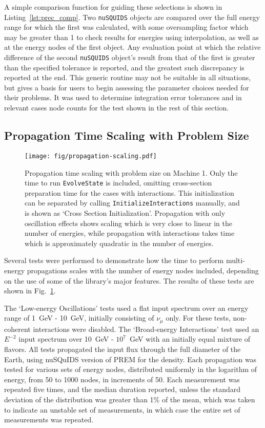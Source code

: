 \documentclass[3p,12pt]{elsarticle}
\newcommand{\ttf}{\ttfamily}
\begin{document}
A simple comparison function for guiding these selections is shown in Listing~\ref{lst:prec_comp}. 
Two \lstinline{nuSQUIDS} objects are compared over the full energy range for which the first was calculated, with some oversampling factor which may be greater than 1 to check results for energies using interpolation, as well as at the energy nodes of the first object. 
Any evaluation point at which the relative difference of the second \lstinline{nuSQUIDS} object's result from that of the first is greater than the specified tolerance is reported, and the greatest such discrepancy is reported at the end. 
This generic routine may not be suitable in all situations, but gives a basis for users to begin assessing the parameter choices needed for their problems. 
It was used to determine integration error tolerances and in relevant cases node counts for the test shown in the rest of this section. 

\subsection{Propagation Time Scaling with Problem Size}
\label{ssec:propagation_scaling}

\begin{figure}[t]
  \centering
  \texttt{[image: fig/propagation-scaling.pdf]}
  \caption{Propagation time scaling with problem size on Machine 1. Only the time to run \lstinline{EvolveState} is included, omitting cross-section preparation time for the cases with interactions. This initialization can be separated by calling \lstinline{InitializeInteractions} manually, and is shown as `Cross Section Initialization'. Propagation with only oscillation effects shows scaling which is very close to linear in the number of energies, while propagation with interactions takes time which is approximately quadratic in the number of energies.}
  \label{fig:propagation_scaling}
\end{figure}

Several tests were performed to demonstrate how the time to perform multi-energy propagations scales with the number of energy nodes included, depending on the use of some of the library's major features. 
The results of these tests are shown in Fig.~\ref{fig:propagation_scaling}. 

The `Low-energy Oscillations' tests used a flat input spectrum  over an energy range of 1~GeV - 10~GeV, initially consisting of $\nu_\mu$ only. 
For these tests, non-coherent interactions were disabled. 
The `Broad-energy Interactions' test used an $E^{-2}$ input spectrum over 10~GeV - $10^7$~GeV with an initially equal mixture of flavors. 
All tests propagated the input flux through the full diameter of the Earth, using {\ttf nuSQuIDS} version of PREM for the density. 
Each propagation was tested for various sets of energy nodes, distributed uniformly in the logarithm of energy, from 50 to 1000 nodes, in increments of 50. 
Each measurement was repeated five times, and the median duration reported, unless the standard deviation of the distribution was greater than 1\% of the mean, which was taken to indicate an unstable set of measurements, in which case the entire set of measurements was repeated. 
\end{document}
